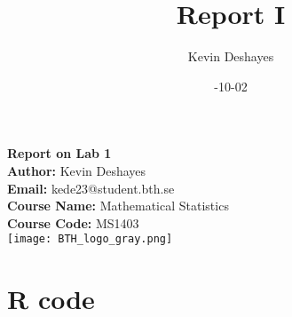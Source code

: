 \documentclass{report}
\title{Report I}
\author{Kevin Deshayes}
\date{\2024-10-02}
\begin{document}
\begin{titlepage}
    \centering
    {\huge\bfseries Report on Lab 1 \\[1cm]}  %
    \textbf{Author:} Kevin Deshayes\\[0.5cm]  %
    \textbf{Email:} kede23@student.bth.se\\[0.5cm]  %
    \textbf{Course Name:} Mathematical Statistics \\[0.5cm]  %
    \textbf{Course Code:} MS1403\\[1.5cm]  %
    
    \texttt{[image: BTH\_logo\_gray.png]} %
    \vfill
    \vspace{2cm}
\end{titlepage}

\tableofcontents
\newpage
\section{R code}
\end{document}
